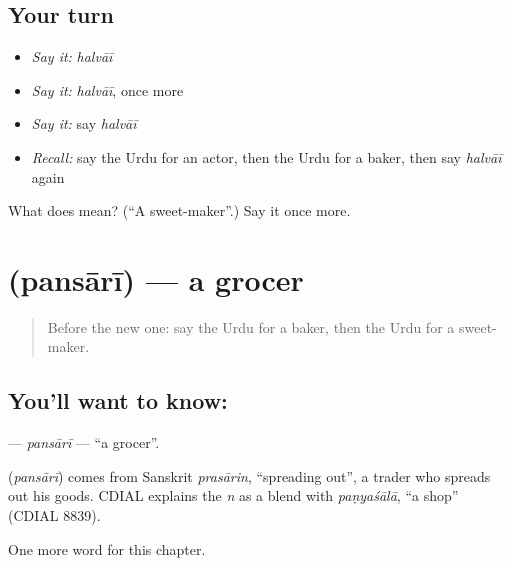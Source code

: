 \subsection*{Your turn}
\begin{itemize}
\raggedright
  \item \emph{Say it:} \emph{halvāī}
  \item \emph{Say it:} \emph{halvāī}, once more
  \item \emph{Say it:} say \emph{halvāī}
  \item \emph{Recall:} say the Urdu for an actor, then the Urdu for a baker, then say \emph{halvāī} again
\end{itemize}

\begin{tcolorbox}[breakable,colback=teal!4,colframe=teal!35!black,title={Before you move on}]
What does  mean? (\textquotedblleft{}A sweet-maker\textquotedblright{}.) Say it once more.
\end{tcolorbox}
\section[\texorpdfstring{\ur{پنساری} (pansārī)}{پنساری (pansārī)}]{ (pansārī) — a grocer}

\label{lesson:UR-C263-pansari}



\begin{quote}
Before the new one: say the Urdu for a baker, then the Urdu for a sweet-maker.
\end{quote}

\subsection*{You'll want to know: }
\textbf{} — \emph{pansārī} — \textquotedblleft{}a grocer\textquotedblright{}.

\begin{cousinweb}
\textbf{} (\emph{pansārī}) comes from Sanskrit \emph{prasārin}, \textquotedblleft{}spreading out\textquotedblright{}, a trader who spreads out his goods. CDIAL explains the \emph{n} as a blend with \emph{paṇyaśālā}, \textquotedblleft{}a shop\textquotedblright{} (CDIAL 8839).
\end{cousinweb}

\begin{grammarlens}[title={What you've built}]
One more word for this chapter.
\end{grammarlens}

